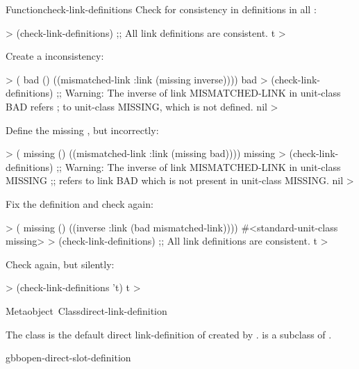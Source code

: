 \documentclass[10pt,twoside,english,pdftex]{article}
\begin{document}
\begin{functiondoc}{Function}{check-link-definitions}{
    \returns{} }
\fnexamples
Check for consistency in  definitions in all
: 
%
\W\supp
\begin{example}
  > (check-link-definitions)
  ;; All link definitions are consistent.
  t
  >
\end{example}
%
%
%
Create a  inconsistency:
%
\W\supp\notpretop
\begin{example}
  > ( bad () 
       ((mismatched-link :link (missing inverse))))
  bad
  > (check-link-definitions)
  ;; Warning: The inverse of link MISMATCHED-LINK in unit-class BAD refers
  ;           to unit-class MISSING, which is not defined.
  nil
  >
\end{example}
%
Define the missing , but incorrectly:
%
\W\supp\notpretop
\begin{example}
  > ( missing () ((mismatched-link :link (missing bad))))
  missing
  > (check-link-definitions)
  ;; Warning: The inverse of link MISMATCHED-LINK in unit-class MISSING
  ;;          refers to link BAD which is not present in unit-class MISSING.
  nil
  >
\end{example}
%
Fix the definition and check again:
%
\W\supp\notpretop
\begin{example}
  > ( missing () ((inverse :link (bad mismatched-link))))
  #<standard-unit-class missing>
  > (check-link-definitions)
  ;; All link definitions are consistent.
  t
  >
\end{example}
%
Check again, but silently:
%
\W\supp\notpretop
\begin{example}
  > (check-link-definitions 't)
  t
  > 
\end{example}

\end{functiondoc}


\begin{functiondoc}{Metaobject~Class}{direct-link-definition}{}
%

\fnsyntax

\fnpackage {}

\fnmodule {}

\fndescription The class  is the default
direct link-definition  of 
created by .
 is a subclass of
.

\begin{alsos}{gbbopen-direct-slot-definition}
\end{alsos}

\end{functiondoc}
\end{document}

